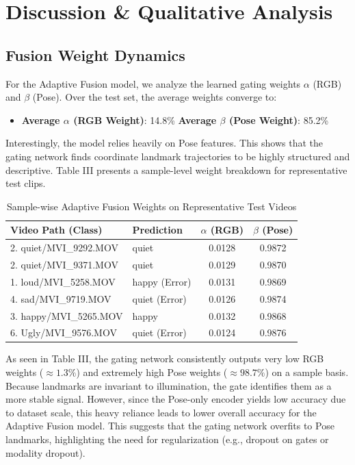 \documentclass[conference]{IEEEtran}
\begin{document}
\begin{table}[t]
\section{Discussion \& Qualitative Analysis}

\subsection{Fusion Weight Dynamics}
For the Adaptive Fusion model, we analyze the learned gating weights $\alpha$ (RGB) and $\beta$ (Pose). Over the test set, the average weights converge to:
\begin{itemize}
    \item \textbf{Average $\alpha$ (RGB Weight)}: 14.8\%
    \textbf{Average $\beta$ (Pose Weight)}: 85.2\%
\end{itemize}
Interestingly, the model relies heavily on Pose features. This shows that the gating network finds coordinate landmark trajectories to be highly structured and descriptive. 
Table III presents a sample-level weight breakdown for representative test clips.

\begin{table}[h]
\centering
\caption{Sample-wise Adaptive Fusion Weights on Representative Test Videos}
\begin{tabular}{llcc}
\toprule
\textbf{Video Path (Class)} & \textbf{Prediction} & $\alpha$ \textbf{(RGB)} & $\beta$ \textbf{(Pose)} \\
\midrule
2. quiet/MVI\_9292.MOV & quiet & 0.0128 & 0.9872 \\
2. quiet/MVI\_9371.MOV & quiet & 0.0129 & 0.9870 \\
1. loud/MVI\_5258.MOV & happy (Error) & 0.0131 & 0.9869 \\
4. sad/MVI\_9719.MOV & quiet (Error) & 0.0126 & 0.9874 \\
3. happy/MVI\_5265.MOV & happy & 0.0132 & 0.9868 \\
6. Ugly/MVI\_9576.MOV & quiet (Error) & 0.0124 & 0.9876 \\
\bottomrule
\end{tabular}
\label{tab:weights}
\end{table}

As seen in Table III, the gating network consistently outputs very low RGB weights ($\approx 1.3\%$) and extremely high Pose weights ($\approx 98.7\%$) on a sample basis. Because landmarks are invariant to illumination, the gate identifies them as a more stable signal. However, since the Pose-only encoder yields low accuracy due to dataset scale, this heavy reliance leads to lower overall accuracy for the Adaptive Fusion model. This suggests that the gating network overfits to Pose landmarks, highlighting the need for regularization (e.g., dropout on gates or modality dropout).


\end{table}
\end{document}
